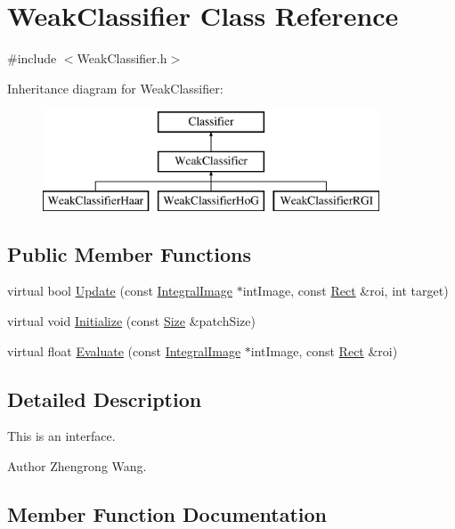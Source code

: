 \hypertarget{classWeakClassifier}{}\section{Weak\+Classifier Class Reference}
\label{classWeakClassifier}


{\ttfamily \#include $<$Weak\+Classifier.\+h$>$}

Inheritance diagram for Weak\+Classifier\+:\begin{figure}[H]
\begin{center}
\leavevmode
\includegraphics[height=3.000000cm]{classWeakClassifier}
\end{center}
\end{figure}
\subsection*{Public Member Functions}
\begin{DoxyCompactItemize}
\item 
virtual bool \hyperlink{classWeakClassifier_ad4c967e2f0d186a841722f8fea9dbd9c}{Update} (const \hyperlink{classIntegralImage}{Integral\+Image} $\ast$int\+Image, const \hyperlink{classRect}{Rect} \&roi, int target)
\item 
virtual void \hyperlink{classWeakClassifier_a9e62b318d87b30965646bdc94662c01d}{Initialize} (const \hyperlink{classSize}{Size} \&patch\+Size)
\item 
virtual float \hyperlink{classWeakClassifier_a083dddaa52fe399386f07a20f231ec49}{Evaluate} (const \hyperlink{classIntegralImage}{Integral\+Image} $\ast$int\+Image, const \hyperlink{classRect}{Rect} \&roi)
\end{DoxyCompactItemize}


\subsection{Detailed Description}
This is an interface. \begin{DoxyAuthor}{Author}
Zhengrong Wang. 
\end{DoxyAuthor}


\subsection{Member Function Documentation}
\hypertarget{classWeakClassifier_a083dddaa52fe399386f07a20f231ec49}{}
